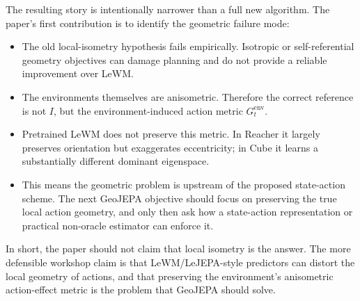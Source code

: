 ﻿\documentclass{article}
\begin{document}
The resulting story is intentionally narrower than a full new algorithm.  The
paper's first contribution is to identify the geometric failure mode:
\begin{itemize}
  \item The old local-isometry hypothesis fails empirically.  Isotropic or
  self-referential geometry objectives can damage planning and do not provide
  a reliable improvement over LeWM.
  \item The environments themselves are anisometric.  Therefore the correct
  reference is not \(I\), but the environment-induced action metric
  \(G^{\mathrm{env}}_t\).
  \item Pretrained LeWM does not preserve this metric.  In Reacher it largely
  preserves orientation but exaggerates eccentricity; in Cube it learns a
  substantially different dominant eigenspace.
  \item This means the geometric problem is upstream of the proposed
  state-action scheme.  The next GeoJEPA objective should focus on preserving
  the true local action geometry, and only then ask how a state-action
  representation or practical non-oracle estimator can enforce it.
\end{itemize}

In short, the paper should not claim that local isometry is the answer.  The
more defensible workshop claim is that LeWM/LeJEPA-style predictors can distort
the local geometry of actions, and that preserving the environment's
anisometric action-effect metric is the problem that GeoJEPA should solve.
\end{document}
